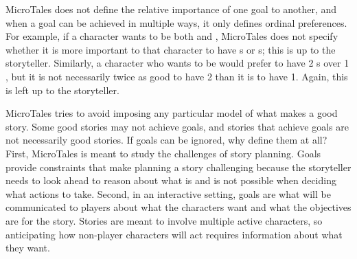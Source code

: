 \documentclass{nilreport}
\begin{document}
MicroTales does not define the relative importance of one goal to another, and when a goal can be achieved in multiple ways, it only defines ordinal preferences. For example, if a character wants to be both  and , MicroTales does not specify whether it is more important to that character to have s or s; this is up to the storyteller. Similarly, a character who wants to be  would prefer to have 2 s over 1 , but it is not necessarily twice as good to have 2 than it is to have 1. Again, this is left up to the storyteller.

MicroTales tries to avoid imposing any particular model of what makes a good story. Some good stories may not achieve goals, and stories that achieve goals are not necessarily good stories. If goals can be ignored, why define them at all? First, MicroTales is meant to study the challenges of story planning. Goals provide constraints that make planning a story challenging because the storyteller needs to look ahead to reason about what is and is not possible when deciding what actions to take. Second, in an interactive setting, goals are what will be communicated to players about what the characters want and what the objectives are for the story. Stories are meant to involve multiple active characters, so anticipating how non-player characters will act requires information about what they want.

\end{document}
